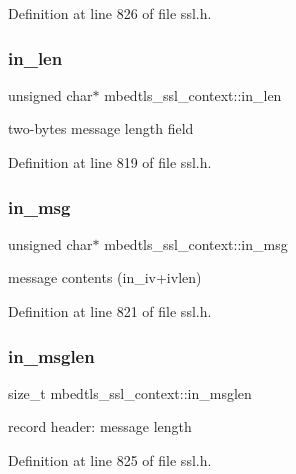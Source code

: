 Definition at line 826 of file ssl.\+h.

\mbox{\label{structmbedtls__ssl__context_af7235ac32f8a336a7636c63af6ef2127}} 
\subsubsection{\texorpdfstring{in\+\_\+len}{in\_len}}
{\footnotesize\ttfamily unsigned char$\ast$ mbedtls\+\_\+ssl\+\_\+context\+::in\+\_\+len}

two-\/bytes message length field 

Definition at line 819 of file ssl.\+h.

\mbox{\label{structmbedtls__ssl__context_a9c55d8cac2040048e56a6a2a694375c8}} 
\subsubsection{\texorpdfstring{in\+\_\+msg}{in\_msg}}
{\footnotesize\ttfamily unsigned char$\ast$ mbedtls\+\_\+ssl\+\_\+context\+::in\+\_\+msg}

message contents (in\+\_\+iv+ivlen) 

Definition at line 821 of file ssl.\+h.

\mbox{\label{structmbedtls__ssl__context_adfee31e1e5269ab17d1df707025df30a}} 
\subsubsection{\texorpdfstring{in\+\_\+msglen}{in\_msglen}}
{\footnotesize\ttfamily size\+\_\+t mbedtls\+\_\+ssl\+\_\+context\+::in\+\_\+msglen}

record header\+: message length 

Definition at line 825 of file ssl.\+h.


